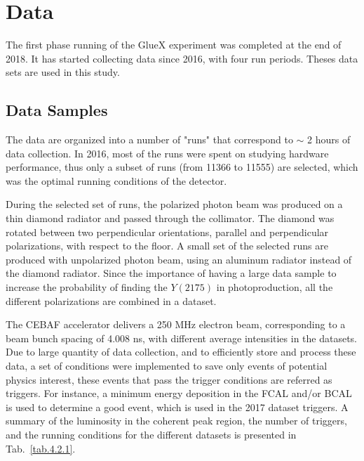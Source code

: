 \section{Data}
\label{p.4.4}

The first phase running of the GlueX experiment was completed at the end of 2018. It has started collecting data since 2016, with four run periods. Theses data sets are used in this study.

\subsection{Data Samples}

The data are organized into a number of "runs" that correspond to $\sim$ 2 hours of data collection. In 2016, most of the runs were spent on studying hardware performance, thus only a subset of runs (from 11366 to 11555) are selected, which was the optimal running conditions of the detector.
~\par During the selected set of runs, the polarized photon beam was produced on a thin diamond radiator and passed through the collimator. The diamond was rotated between two perpendicular orientations, parallel and perpendicular polarizations, with respect to the floor. A small set of the selected runs are produced with unpolarized photon beam, using an aluminum radiator instead of the diamond radiator. Since the importance of having a large data sample to increase the probability of finding the $Y(2175)$ in photoproduction, all the different polarizations are combined in a dataset.
~\par The CEBAF accelerator delivers a 250 MHz electron beam, corresponding to a beam bunch spacing of 4.008 ns, with different average intensities in the datasets. Due to large quantity of data collection, and to efficiently store and process these data, a set of conditions were implemented to save only events of potential physics interest, these events that pass the trigger conditions are referred as triggers. For instance, a minimum energy deposition in the FCAL and/or BCAL is used to determine a good event, which is used in the 2017 dataset triggers. A summary of the luminosity in the coherent peak region, the number of triggers, and the running conditions for the different datasets is presented in Tab.~\ref{tab.4.2.1}.

